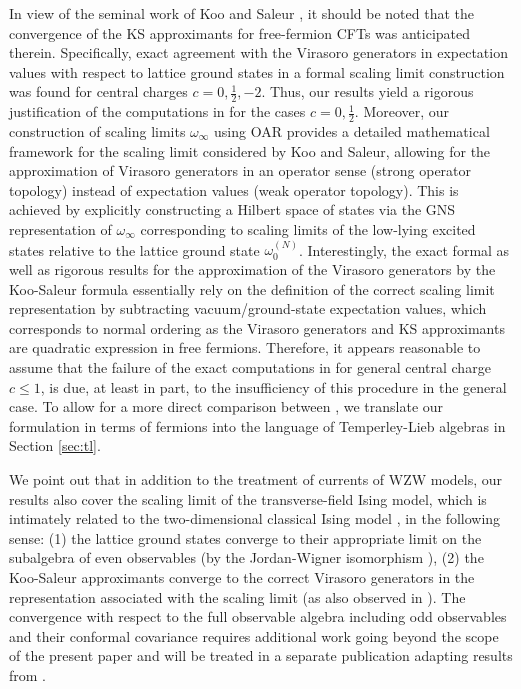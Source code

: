 \documentclass[a4paper, 11pt]{article}
\DeclareMathOperator{\1}{\mathds{1}}
\begin{document}
In view of the seminal work of Koo and Saleur \cite{KooRepresentationsOfThe}, it should be noted that the convergence of the KS approximants for free-fermion CFTs was anticipated therein. Specifically, exact agreement with the Virasoro generators in expectation values with respect to lattice ground states in a formal scaling limit construction was found for central charges $c=0,\tfrac{1}{2},-2$. Thus, our results yield a rigorous justification of the computations in \cite{KooRepresentationsOfThe} for the cases $c=0,\tfrac{1}{2}$. Moreover, our construction of scaling limits $\omega_{\infty}$ using OAR provides a detailed mathematical framework for the scaling limit considered by Koo and Saleur, allowing for the approximation of Virasoro generators in an operator sense (strong operator topology) instead of expectation values (weak operator topology). This is achieved by explicitly constructing a Hilbert space of states via the GNS representation of $\omega_{\infty}$ corresponding to scaling limits of the low-lying excited states relative to the lattice ground state $\omega^{(N)}_{0}$. Interestingly, the exact formal as well as rigorous results for the approximation of the Virasoro generators by the Koo-Saleur formula essentially rely on the definition of the correct scaling limit representation by subtracting vacuum/ground-state expectation values, which corresponds to normal ordering as the Virasoro generators and KS approximants are quadratic expression in free fermions. Therefore, it appears reasonable to assume that the failure of the exact computations in \cite{KooRepresentationsOfThe} for general central charge $c\leq1$, is due, at least in part, to the insufficiency of this procedure in the general case. To allow for a more direct comparison between \cite{KooRepresentationsOfThe}, we translate our formulation in terms of fermions into the language of Temperley-Lieb algebras \cite{TemperleyRelationsBetweenThe, GrimmTheSpin12} in Section \ref{sec:tl}.

\bigskip

We point out that in addition to the treatment of currents of WZW models, our results also cover the scaling limit of the transverse-field Ising model, which is intimately related to the two-dimensional classical Ising model \cite{LiebTwoSolubleModels, SchultzTwoDimensionalIsing}, in the following sense: (1) the lattice ground states converge to their appropriate limit on the subalgebra of even observables (by the Jordan-Wigner isomorphism \cite{EvansQuantumSymmetriesOn}), (2) the Koo-Saleur approximants converge to the correct Virasoro generators in the representation associated with the scaling limit (as also observed in \cite{ZiniConformalFieldTheories}). The convergence with respect to the full observable algebra including odd observables \cite{LashkevichSectorsOfMutually, BostelmannCharacterizationOfLocal} and their conformal covariance requires additional work going beyond the scope of the present paper and will be treated in a separate publication adapting results from \cite{SatoHolonomicQuantumFieldsIV}.
\end{document}
